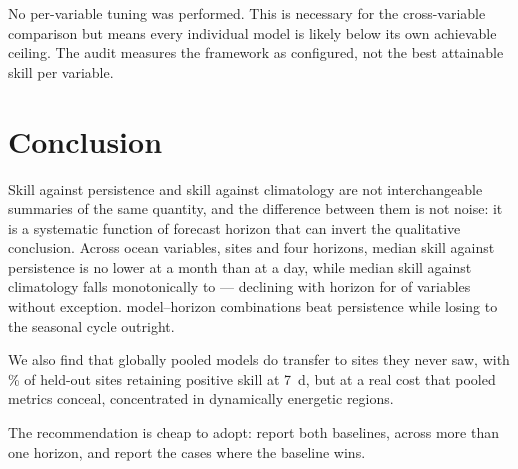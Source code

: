 No per-variable tuning was performed. This is necessary for the cross-variable
comparison but means every individual model is likely below its own achievable
ceiling. The audit measures the framework as configured, not the best
attainable skill per variable.

\section{Conclusion}

Skill against persistence and skill against climatology are not interchangeable
summaries of the same quantity, and the difference between them is not noise:
it is a systematic function of forecast horizon that can invert the qualitative
conclusion. Across \NVars{} ocean variables, \NSites{} sites and four horizons,
median skill against persistence is no lower at a month than at a day, while
median skill against climatology falls monotonically to \MedSkillCThirty{} ---
declining with horizon for \NFallingClim{} of \NVars{} variables without
exception. \NLoseToClim{} model--horizon combinations beat persistence while
losing to the seasonal cycle outright.

We also find that globally pooled models do transfer to sites they never saw,
with \LosoPositiveShare{}\% of held-out sites retaining positive skill at
\SI{7}{\day}, but at a real cost that pooled metrics conceal, concentrated in
dynamically energetic regions.

The recommendation is cheap to adopt: report both baselines, across more than
one horizon, and report the cases where the baseline wins.
